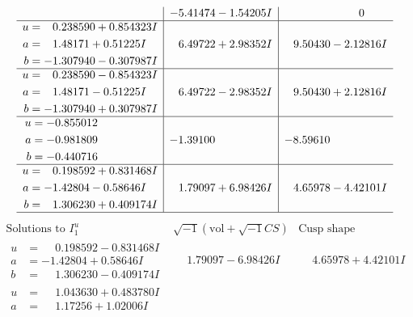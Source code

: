 \documentclass[1p]{elsarticle_modified}
\theoremstyle{definition}
\newcommand{\I}{\sqrt{-1}}
\begin{document}
$$\begin{array}{c|c|c}
 & -5.41474 - 1.54205 I & \phantom{-0.000000 } 0 \\ \hline\begin{aligned}
u &= \phantom{-}0.238590 + 0.854323 I \\
a &= \phantom{-}1.48171 + 0.51225 I \\
b &= -1.307940 - 0.307987 I\end{aligned}
 & \phantom{-}6.49722 + 2.98352 I & \phantom{-}9.50430 - 2.12816 I \\ \hline\begin{aligned}
u &= \phantom{-}0.238590 - 0.854323 I \\
a &= \phantom{-}1.48171 - 0.51225 I \\
b &= -1.307940 + 0.307987 I\end{aligned}
 & \phantom{-}6.49722 - 2.98352 I & \phantom{-}9.50430 + 2.12816 I \\ \hline\begin{aligned}
u &= -0.855012\phantom{ +0.000000I} \\
a &= -0.981809\phantom{ +0.000000I} \\
b &= -0.440716\phantom{ +0.000000I}\end{aligned}
 & -1.39100\phantom{ +0.000000I} & -8.59610\phantom{ +0.000000I} \\ \hline\begin{aligned}
u &= \phantom{-}0.198592 + 0.831468 I \\
a &= -1.42804 - 0.58646 I \\
b &= \phantom{-}1.306230 + 0.409174 I\end{aligned}
 & \phantom{-}1.79097 + 6.98426 I & \phantom{-}4.65978 - 4.42101 I\\
 \hline 
 \end{array}$$\newpage$$\begin{array}{c|c|c}  
\text{Solutions to }I^u_{1}& \I (\text{vol} + \sqrt{-1}CS) & \text{Cusp shape}\\
 \hline 
\begin{aligned}
u &= \phantom{-}0.198592 - 0.831468 I \\
a &= -1.42804 + 0.58646 I \\
b &= \phantom{-}1.306230 - 0.409174 I\end{aligned}
 & \phantom{-}1.79097 - 6.98426 I & \phantom{-}4.65978 + 4.42101 I \\ \hline\begin{aligned}
u &= \phantom{-}1.043630 + 0.483780 I \\
a &= \phantom{-}1.17256 + 1.02006 I \\

\end{aligned}
\end{array}$$
\end{document}
